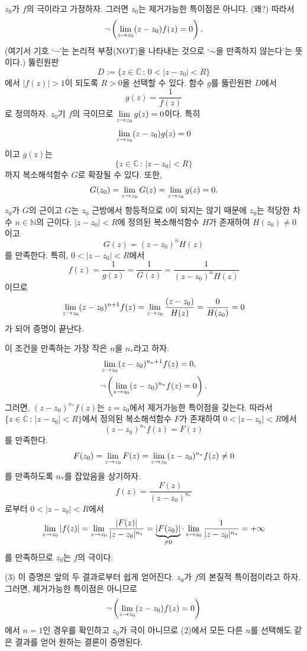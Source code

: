 $z_0$가 $f$의 극이라고 가정하자. 그러면
$z_0$는 제거가능한 특이점은 아니다. (왜?)
따라서
\[
\neg \left( \lim\limits_{z\to z_0} (z-z_0)f(z) = 0 \right).
\]
(여기서 기호 `$\neg$'는 논리적 부정(NOT)을 나타내는 것으로
`$\sim$을 만족하지 않는다'는 뜻이다.)
뚫린원판
\[
D:= \{ z\in\mathbb C\,:\, 0<|z-z_0|<R\}
\]
에서 $|f(z)|>1$이 되도록 $R>0$을 선택할 수 있다.
함수 $g$를 뚫린원판 $D$에서 
\[
g(z) = \dfrac1{f(z)}
\]
로 정의하자.
$z_0$기 $f$의 극이므로 $\lim\limits_{z\to z_0} g(z) = 0$이다.
특히 
\[
\lim\limits_{z\to z_0} (z-z_0)g(z)=0
\]
이고 $g(z)$는 
\[
\{ z\in\mathbb C\,:\, |z-z_0|<R\}
\]
까지 복소해석함수 $G$로 확장될 수 있다.
또한, 
\[
G(z_0) = \lim\limits_{z\to z_0}  G(z) = \lim\limits_{z\to z_0}  g(z) = 0.
\]
$z_0$가 $G$의 근이고 $G$는 $z_0$ 근방에서 항등적으로 $0$이 되지는 않기 때문에
$z_0$는 적당한 차수 $n\in\mathbb N$의 근이다.
$|z-z_0|<R$에 정의된 복소해석함수 $H$가 존재하여 $H(z_0)\ne0$이고
\[
G(z) = (z-z_0)^n H(z)
\]
를 만족한다.
특히, $0<|z-z_0|<R$에서
\[
f(z) = \dfrac1{g(z)} = \dfrac1{G(z)}
= \dfrac1{(z-z_0)^n H(z)}
\]
이므로
\[
\lim\limits_{z\to z_0} (z-z_0)^{n+1}f(z) 
= \lim\limits_{z\to z_0} \displaystyle\frac{(z-z_0)}{H(z)} = \displaystyle\frac{0}{H(z_0)} = 0
\]
가 되어 증명이 끝난다.


이 조건을 만족하는 가장 작은 $n$을 $n_*$라고 하자.
\begin{align*}
& \lim\limits_{z\to z_0} (z-z_0)^{n_*+1} f(z) = 0, \\
& \neg\left( \lim\limits_{z\to z_0} (z-z_0)^{n_*} f(z) = 0 \right).
\end{align*}
그러면, $(z-z_0)^{n_*} f(z)$는 $z=z_0$에서 제거가능한 특이점을 갖는다.
따라서 $\{ z\in\mathbb C\,:\, |z-z_0|<R\}$에서 
정의된 복소해석함수 $F$가 존재하여
$0<|z-z_0|<R$에서
\[
(z-z_0)^{n_*} f(z) = F(z)
\]
를 만족한다. 
\[
F(z_0) = \lim\limits_{z\to z_0} F(z) = \lim\limits_{z\to z_0} (z-z_0)^{n_*} f(z) \ne 0
\]
를 만족하도록 $n_*$를 잡았음을 상기하자.
\[
f(z) = \dfrac{F(z)}{(z-z_0)^{n_*}}
\]
로부터 $0<|z-z_0| < R$에서
\[
\lim\limits_{z\to z_0} |f(z)| = \lim\limits_{z\to z_0}\displaystyle\frac{|F(z)|}{|z-z_0|^{n_*}}
= \underbrace{|F(z_0)|}_{\ne0} \cdot
\lim\limits_{z\to z_0} \displaystyle\frac1{|z-z_0|^{n_*}} = + \infty
\]
를 만족하므로 $z_0$는 $f$의 극이다.

(3) 이 증명은 앞의 두 결과로부터 쉽게 얻어진다.
$z_0$가 $f$의 본질적 특이점이라고 하자. 그러면, 제거가능한 특이점은 아니므로
\[
 \neg\left( \lim\limits_{z\to z_0} (z-z_0)f(z) = 0 \right)
\]
에서 $n=1$인 경우를 확인하고
$z_0$가 극이 아니므로 (2)에서 모든 다른 $n$를 선택해도 같은 결과를 얻어
원하는 결론이 증명된다.


